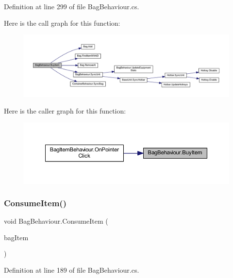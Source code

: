 Definition at line 299 of file Bag\+Behaviour.\+cs.

Here is the call graph for this function\+:
\nopagebreak
\begin{figure}[H]
\begin{center}
\leavevmode
\includegraphics[width=350pt]{class_bag_behaviour_a22439e4f35b9173c64d16c2534c4b388_cgraph}
\end{center}
\end{figure}
Here is the caller graph for this function\+:
\nopagebreak
\begin{figure}[H]
\begin{center}
\leavevmode
\includegraphics[width=350pt]{class_bag_behaviour_a22439e4f35b9173c64d16c2534c4b388_icgraph}
\end{center}
\end{figure}
\mbox{\label{class_bag_behaviour_a407231bcd34e96129c9ae624a484a045}} 
\subsubsection{\texorpdfstring{ConsumeItem()}{ConsumeItem()}}
{\footnotesize\ttfamily void Bag\+Behaviour.\+Consume\+Item (\begin{DoxyParamCaption}\item[{\mbox{\hyperlink{class_bag_item_behaviour}{Bag\+Item\+Behaviour}}}]{bag\+Item }\end{DoxyParamCaption})}



Definition at line 189 of file Bag\+Behaviour.\+cs.

